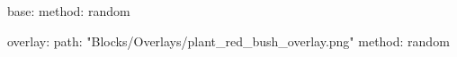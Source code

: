 base:
  method: random
  
overlay:
  path: "Blocks/Overlays/plant_red_bush_overlay.png"
  method: random